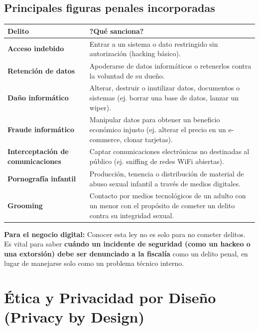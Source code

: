 \documentclass[12pt,a4paper]{article}
\renewcommand{\arraystretch}{1.25}
\begin{document}
\subsection{Principales figuras penales incorporadas}
\renewcommand{\arraystretch}{1.5}
\begin{tabularx}{\textwidth}{|>{\bfseries\color{azulLegal}}p{4cm}|X|}
\hline
\rowcolor{grisClaro}
\textbf{Delito} & \textbf{?Qu\'e sanciona?} \\
\hline
Acceso indebido & Entrar a un sistema o dato restringido sin autorizaci\'on (hacking b\'asico). \\
\hline
Retenci\'on de datos & Apoderarse de datos inform\'aticos o retenerlos contra la voluntad de su due\~no. \\
\hline
Da\~no inform\'atico & Alterar, destruir o inutilizar datos, documentos o sistemas (ej. borrar una base de datos, lanzar un wiper). \\
\hline
Fraude inform\'atico & Manipular datos para obtener un beneficio econ\'omico injusto (ej. alterar el precio en un e-commerce, clonar tarjetas). \\
\hline
Interceptaci\'on de comunicaciones & Captar comunicaciones electr\'onicas no destinadas al p\'ublico (ej. sniffing de redes WiFi abiertas). \\
\hline
Pornograf\'ia infantil & Producci\'on, tenencia o distribuci\'on de material de abuso sexual infantil a trav\'es de medios digitales. \\
\hline
Grooming & Contacto por medios tecnol\'ogicos de un adulto con un menor con el prop\'osito de cometer un delito contra su integridad sexual. \\
\hline
\end{tabularx}

\begin{cajaNota}
\textbf{Para el negocio digital:} Conocer esta ley no es solo para no cometer delitos. Es vital para saber \textbf{cu\'ando un incidente de seguridad (como un hackeo o una extorsi\'on) debe ser denunciado a la fiscal\'ia} como un delito penal, en lugar de manejarse solo como un problema t\'ecnico interno.
\end{cajaNota}

\newpage
\section{\'Etica y Privacidad por Dise\~no (Privacy by Design)}
\end{document}
